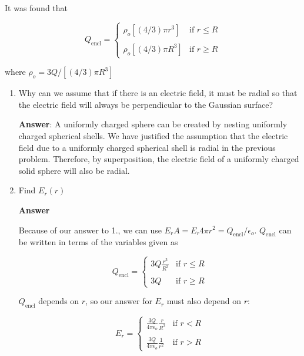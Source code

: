 \documentclass{article}
\newcommand{\ds}[0]{\displaystyle}
\begin{document}
It was found that

$$
Q_{\text{encl}} = \begin{cases}
  \rho_o [(4/3)\pi r^3]   &\text{if  }r \le R \\\\
  \rho_o [(4/3)\pi R^3] &\text{if } r \ge R
\end{cases}
$$

where $\ds \rho_o=3Q/[(4/3)\pi R^3]$



\begin{enumerate}

  \item Why can we assume that if there is an electric field, it must be radial so that the electric field will always be perpendicular to the Gaussian surface?

        \ifsolutions
        \textbf{Answer}: A uniformly charged sphere can be created by nesting uniformly charged spherical shells. We have justified the assumption that the electric field due to a uniformly charged spherical shell is radial in the previous problem. Therefore, by superposition, the electric field of a uniformly charged solid sphere will also be radial.
        \else
        \vskip 96pt
        \fi

  \item Find $E_r(r)$

        \ifsolutions
        \textbf{Answer}

        Because of our answer to 1., we can use $E_rA = E_r 4\pi r^2 = {Q_{\text{encl}}}/{\epsilon_o}$. $Q_{\text{encl}}$ can be written in terms of the variables given as

        $$
        Q_{\text{encl}} = \begin{cases}
          \ds3Q\frac{r^3}{R^3}   &\text{if  }r \le R \\\\
          3Q    &\text{if  }r \ge R
        \end{cases}
        $$

        $Q_{\text{encl}}$ depends on $r$, so our answer for $E_r$ must also depend on $r$:

        $$
        E_r = \begin{cases}
          \ds\frac{3Q}{4\pi\epsilon_o}\frac{r}{R^3} & \text{if } r < R \\\\
          \ds\frac{3Q}{4\pi\epsilon_o}\frac{1}{r^2} &\text{if } r > R
        \end{cases}
        $$


\end{enumerate}
\end{document}
